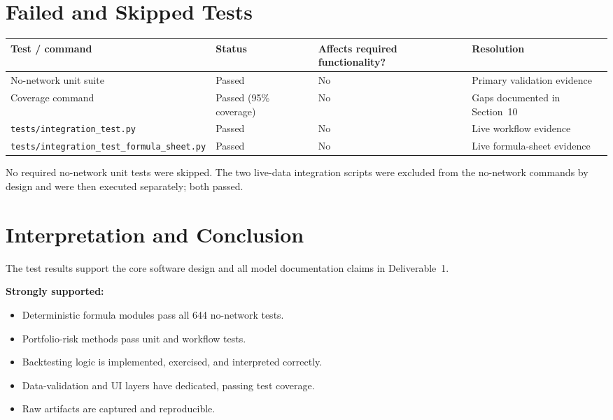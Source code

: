 \documentclass[11pt]{article}
\newcommand{\code}[1]{\texttt{#1}}
\begin{document}
\section{Failed and Skipped Tests}

\begin{center}
\begin{tabular}{L{5cm}L{3.5cm}L{2.8cm}L{3.2cm}}
\toprule
\textbf{Test / command} & \textbf{Status} & \textbf{Affects required functionality?} & \textbf{Resolution} \\
\midrule
No-network unit suite                      & Passed & No & Primary validation evidence \\
Coverage command                           & Passed (95\% coverage) & No & Gaps documented in Section~10 \\
\code{tests/\allowbreak integration\_test.py}          & Passed & No & Live workflow evidence \\
\code{tests/\allowbreak integration\_test\_\allowbreak formula\_sheet.py} & Passed & No & Live formula-sheet evidence \\
\bottomrule
\end{tabular}
\end{center}

No required no-network unit tests were skipped.  The two live-data
integration scripts were excluded from the no-network commands by design
and were then executed separately; both passed.

\section{Interpretation and Conclusion}

The test results support the core software design and all model
documentation claims in Deliverable~1.

\textbf{Strongly supported:}
\begin{itemize}
  \item Deterministic formula modules pass all 644 no-network tests.
  \item Portfolio-risk methods pass unit and workflow tests.
  \item Backtesting logic is implemented, exercised, and interpreted correctly.
  \item Data-validation and UI layers have dedicated, passing test coverage.
  \item Raw artifacts are captured and reproducible.
\end{itemize}
\end{document}
